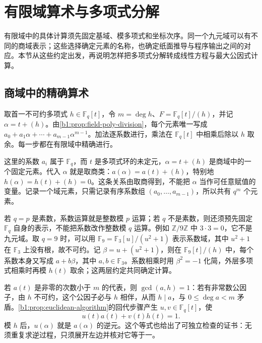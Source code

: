 
\section{有限域算术与多项式分解}
\label{b1:sec:B01}

有限域中的具体计算须先固定基域、模多项式和坐标次序。同一个九元域可以有不同的商域表示；这些选择确定元素的名称，也确定纸面推导与程序输出之间的对应。本节从这些约定出发，再说明怎样把多项式分解转成线性方程与最大公因式计算。

\subsection{商域中的精确算术}
\label{b1:subsec:B01:01}

取首一不可约多项式 \(h\in\mathbb F_q[t]\)，令 \(m=\deg h\)、\(F=\mathbb F_q[t]/(h)\)，并记 \(\alpha=t+(h)\)。由\cref{b1:prop:field-poly-division}，每个元素唯一写成 \(a_0+a_1\alpha+\cdots+a_{m-1}\alpha^{m-1}\)。加法逐系数进行，乘法在 \(\mathbb F_q[t]\) 中相乘后除以 \(h\) 取余。每一步都在有限域中精确进行。

\ProseParagraphBreak
这里的系数 \(a_i\) 属于 \(\mathbb F_q\)，而 \(t\) 是多项式环的未定元，\(\alpha=t+(h)\) 是商域中的一个固定元素。代入 \(\alpha\) 就是取商类：\(a(\alpha)=a(t)+(h)\)，特别地 \(h(\alpha)=h(t)+(h)=0\)。这条关系由取商得到，不能把 \(\alpha\) 当作可任意赋值的变量。记录一个域元素，只需记录有序系数组 \((a_0,\ldots,a_{m-1})\)，所以共有 \(q^m\) 个元素。

\ProseParagraphBreak
若 \(q=p\) 是素数，系数运算就是整数模 \(p\) 运算；若 \(q\) 不是素数，则还须预先固定 \(\mathbb F_q\) 自身的表示，不能把系数改作整数模 \(q\) 运算。例如 \(\mathbb Z/9\mathbb Z\) 中 \(3\cdot3=0\)，它不是九元域。取 \(q=9\) 时，可以用 \(\mathbb F_9=\mathbb F_3[u]/(u^2+1)\) 表示系数域，其中 \(u^2+1\) 在 \(\mathbb F_3\) 上没有根，故不可约。记 \(\beta=u+(u^2+1)\)，则在 \(\mathbb F_9[t]/(h)\) 中，每个系数本身又写成 \(a+b\beta\)，其中 \(a,b\in\mathbb F_3\)。系数相乘时用 \(\beta^2=-1\) 化简，外层多项式相乘时再模 \(h(t)\) 取余；这两层约定共同确定计算。

\ProseParagraphBreak
若 \(a(t)\) 是非零的次数小于 \(m\) 的代表，则 \(\gcd(a,h)=1\)：若有非常数公因子，由 \(h\) 不可约，这个公因子必与 \(h\) 相伴，从而 \(h\mid a\)，与 \(0\leq\deg a<m\) 矛盾。\cref{b1:prop:euclidean-algorithm}的回代步骤产生 \(u,v\in\mathbb F_q[t]\)，使
\begin{equation}\label{b1:eq:B-inverse-certificate}
	u(t)a(t)+v(t)h(t)=1.
\end{equation}
模 \(h\) 后，\(u(\alpha)\) 就是 \(a(\alpha)\) 的逆元。这个等式也给出了可独立检查的证书：无须重复求逆过程，只须展开左边并核对它等于一。

